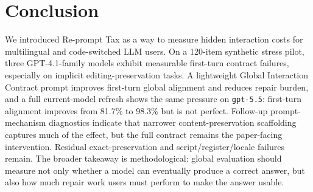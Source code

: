 \section{Conclusion}

We introduced Re-prompt Tax as a way to measure hidden interaction costs for
multilingual and code-switched LLM users. On a 120-item synthetic stress pilot,
three GPT-4.1-family models exhibit measurable first-turn contract failures,
especially on implicit editing-preservation tasks. A lightweight Global
Interaction Contract prompt improves first-turn global alignment and reduces
repair burden, and a full current-model refresh shows the same pressure on
\texttt{gpt-5.5}: first-turn alignment improves from 81.7\% to 98.3\% but is
not perfect. Follow-up prompt-mechanism diagnostics indicate that narrower
content-preservation scaffolding captures much of the effect, but the full
contract remains the paper-facing intervention. Residual exact-preservation and
script/register/locale failures remain. The broader takeaway is methodological:
global evaluation
should measure not only whether a model can eventually produce a correct answer,
but also how much repair work users must perform to make the answer usable.
